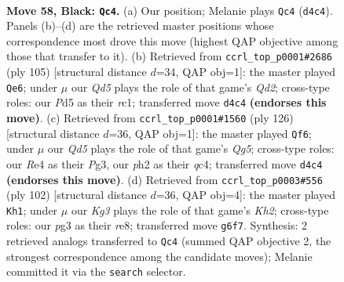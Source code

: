 \documentclass[11pt]{article}
\begin{document}
\clearpage

\begin{figure}[p]\centering
\begin{subfigure}{0.46\textwidth}\centering
\resizebox{\linewidth}{!}{%
\newchessgame
\chessboard[
  setfen={8/8/5pk1/3p4/3qr3/Q5P1/P5KP/8 b - - 11 58},
  showmover=false,
  pgfstyle=straightmove, color=movearrow, markmove={d4-c4}
]}
\caption{}
\end{subfigure}\hfill
\begin{subfigure}{0.46\textwidth}\centering
\resizebox{\linewidth}{!}{%
\newchessgame
\chessboard[
  setfen={1Q6/3qr2k/8/5p1p/8/6P1/6PK/2R5 b - - 3 53},
  showmover=false,
  pgfstyle=straightmove, color=movearrow, markmove={d7-e6}
]}
\caption{}
\end{subfigure}
\\[4pt]
\begin{subfigure}{0.46\textwidth}\centering
\resizebox{\linewidth}{!}{%
\newchessgame
\chessboard[
  setfen={5k2/5p2/8/4P1Q1/2qp4/6PK/8/8 w - - 10 64},
  showmover=false,
  pgfstyle=straightmove, color=movearrow, markmove={g5-f6}
]}
\caption{}
\end{subfigure}\hfill
\begin{subfigure}{0.46\textwidth}\centering
\resizebox{\linewidth}{!}{%
\newchessgame
\chessboard[
  setfen={4r3/6pk/7p/8/2q5/7P/5QPK/5R2 w - - 10 52},
  showmover=false,
  pgfstyle=straightmove, color=movearrow, markmove={h2-h1}
]}
\caption{}
\end{subfigure}
\caption{\textbf{Move 58, Black: \texttt{Qc4}.} (a) Our position; Melanie plays \texttt{Qc4} (\texttt{d4c4}). Panels (b)--(d) are the retrieved master positions whose correspondence most drove this move (highest QAP objective among those that transfer to it). (b) Retrieved from \texttt{ccrl\_top\_p0001\#2686} (ply 105) [structural distance $d$=34, QAP obj=1]: the master played \texttt{Qe6}; under $\mu$ our \emph{Qd5} plays the role of that game's \emph{Qd2}; cross-type roles: our \emph{P}d5 as their \emph{r}c1; transferred move \texttt{d4c4} \textbf{(endorses this move)}. (c) Retrieved from \texttt{ccrl\_top\_p0001\#1560} (ply 126) [structural distance $d$=36, QAP obj=1]: the master played \texttt{Qf6}; under $\mu$ our \emph{Qd5} plays the role of that game's \emph{Qg5}; cross-type roles: our \emph{R}e4 as their \emph{P}g3, our \emph{p}h2 as their \emph{q}c4; transferred move \texttt{d4c4} \textbf{(endorses this move)}. (d) Retrieved from \texttt{ccrl\_top\_p0003\#556} (ply 102) [structural distance $d$=36, QAP obj=4]: the master played \texttt{Kh1}; under $\mu$ our \emph{Kg3} plays the role of that game's \emph{Kh2}; cross-type roles: our \emph{p}g3 as their \emph{r}e8; transferred move \texttt{g6f7}. Synthesis: 2 retrieved analogs transferred to \texttt{Qc4} (summed QAP objective 2, the strongest correspondence among the candidate moves); Melanie committed it via the \texttt{search} selector.}
\label{fig:thought-m115}
\end{figure}
\end{document}
